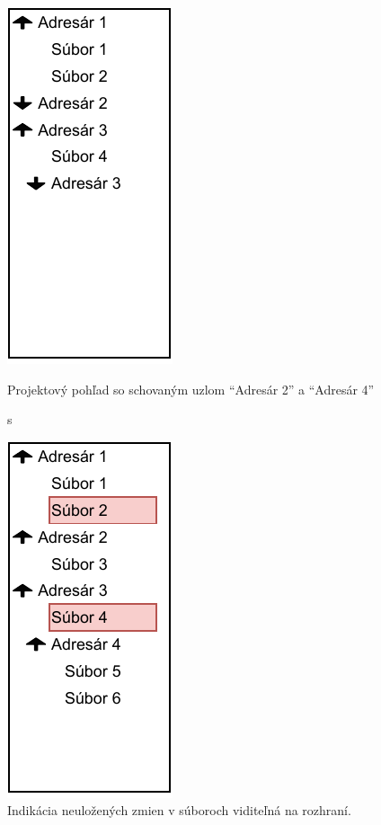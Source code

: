 \begin{enumerate}
	\begin{figure}[H]
		\centering
		\begin{minipage}{.4\textwidth}
			\centering
			\includegraphics[scale=0.75]{obrazky-figures/UI-project-pane}
			\caption{ Projektový pohľad so schovaným uzlom ``Adresár 2'' a ``Adresár 4''}s
		\end{minipage}
		\begin{minipage}{.05\textheight} %
			\quad
		\end{minipage}
		\begin{minipage}{.4\textwidth}
			\centering
			\includegraphics[scale=0.75]{obrazky-figures/UI-project-pane-dirty}
			\caption{Indikácia neuložených zmien v súboroch viditeľná na rozhraní.}
		\end{minipage}
	\end{figure}
	

\end{enumerate}
